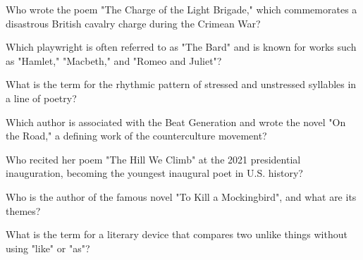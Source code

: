 \documentclass[12pt,a4paper]{book}
\begin{document}
\begin{enhancedmcq}[Question 11]{Who wrote the poem "The Charge of the Light Brigade," which commemorates a disastrous British cavalry charge during the Crimean War?}
\end{enhancedmcq}

\begin{enhancedmcq}[Question 12]{Which playwright is often referred to as "The Bard" and is known for works such as "Hamlet," "Macbeth," and "Romeo and Juliet"?}
\end{enhancedmcq}

\begin{enhancedmcq}[Question 13]{What is the term for the rhythmic pattern of stressed and unstressed syllables in a line of poetry?}
\end{enhancedmcq}

\begin{enhancedmcq}[Question 14]{Which author is associated with the Beat Generation and wrote the novel "On the Road," a defining work of the counterculture movement?}
\end{enhancedmcq}

\begin{enhancedmcq}[Question 15]{Who recited her poem "The Hill We Climb" at the 2021 presidential inauguration, becoming the youngest inaugural poet in U.S. history?}
\end{enhancedmcq}

\begin{enhancedmcq}[Question 16]{Who is the author of the famous novel "To Kill a Mockingbird", and what are its themes?}
\end{enhancedmcq}

\begin{enhancedmcq}[Question 17]{What is the term for a literary device that compares two unlike things without using "like" or "as"?}
\end{enhancedmcq}
\end{document}
